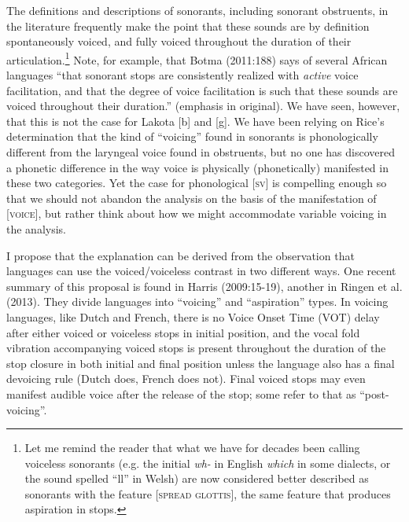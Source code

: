 \documentclass[output=paper]{LSP/langsci}
\begin{document}
The definitions and descriptions of sonorants, including sonorant obstruents, in the literature frequently make the point that these sounds are by definition spontaneously voiced, and fully voiced throughout the duration of their articulation.\footnote{Let me remind the reader that what we have for decades been calling voiceless sonorants (e.g. the initial \textit{wh-} in English \textit{which} in some dialects, or the sound spelled ``ll'' in Welsh) are now considered better described as sonorants with the feature [\textsc{spread glottis}], the same feature that produces aspiration in stops.} Note, for example, that Botma (2011:188) says of several African languages ``that sonorant stops are consistently realized with \textit{active} voice facilitation, and that the degree of voice facilitation is such that these sounds are voiced throughout their duration.'' (emphasis in original). We have seen, however, that this is not the case for Lakota [b] and [g]. We have been relying on Rice's determination that the kind of ``voicing'' found in sonorants is phonologically different from the laryngeal voice found in obstruents, but no one has discovered a phonetic difference in the way voice is physically (phonetically) manifested in these two categories. Yet the case for phonological [\textsc{sv}] is compelling enough so that we should not abandon the analysis on the basis of the manifestation of [\textsc{voice}], but rather think about how we might accommodate variable voicing in the analysis.

I propose that the explanation can be derived from the observation that languages can use the voiced/voiceless contrast in two different ways. One recent summary of this proposal is found in Harris (2009:15-19), another in Ringen et al. (2013). They divide languages into ``voicing'' and ``aspiration'' types. In voicing languages, like Dutch and French, there is no Voice Onset Time (VOT) delay after either voiced or voiceless stops in initial position, and the vocal fold vibration accompanying voiced stops is present throughout the duration of the stop closure in both initial and final position unless the language also has a final devoicing rule (Dutch does, French does not). Final voiced stops may even manifest audible voice after the release of the stop; some refer to that as ``post-voicing''.
\end{document}
